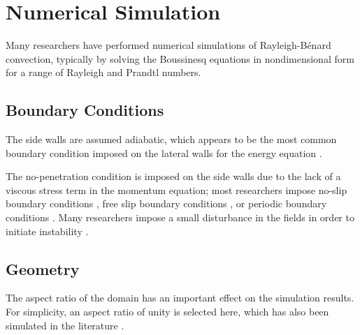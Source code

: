 \documentclass[10pt]{article}
\numberwithin{equation}{section} %
\begin{document}
\begin{comment}
\subsection{Streamfunction Form}
The boundary layer equations derived in Section \ref{sec:PBL} are incompressible and two-dimensional, permitting the insertion of the stream function \(\psi\) in place of velocity, automatically satisfying the continuity equation:

\beq
V_x=\frac{\partial\psi}{\partial z}
\eeq

\beq
V_z=-\frac{\partial\psi}{\partial x}
\eeq
\end{comment}


\clearpage
\section{Numerical Simulation}

Many researchers have performed numerical simulations of Rayleigh-B\'enard convection, typically by solving the Boussinesq equations in nondimensional form for a range of Rayleigh and Prandtl numbers.

\subsection{Boundary Conditions}

The side walls are assumed adiabatic, which appears to be the most common boundary condition imposed on the lateral walls for the energy equation \cite{chandra,verma,poel,schmalzl}. 

The no-penetration condition is imposed on the side walls due to the lack of a viscous stress term in the momentum equation; most researchers impose no-slip boundary conditions \cite{chandra,verma,poel}, free slip boundary conditions \cite{verma}, or periodic boundary conditions \cite{sandberg}. Many researchers impose a small disturbance in the fields in order to initiate instability \cite{schmalzl,sandberg}.

\subsection{Geometry}

The aspect ratio of the domain has an important effect on the simulation results. For simplicity, an aspect ratio of unity is selected here, which has also been simulated in the literature \cite{chandra}.

\clearpage

\clearpage
\providecommand*{\phantomsection}{}
\phantomsection
{}


\end{document}
